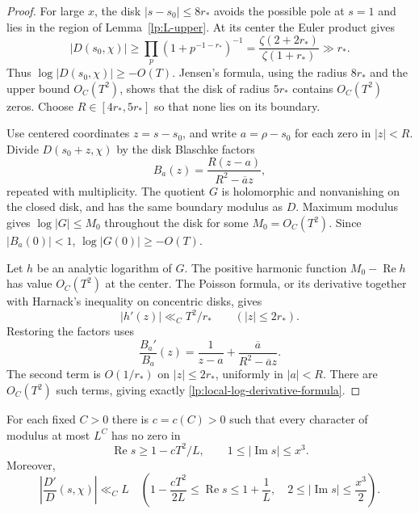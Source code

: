 \begin{proof}
For large $x$, the disk $|s-s_0|\le8r_*$ avoids the possible pole at
$s=1$ and lies in the region of Lemma~\ref{lp:L-upper}.
At its center the Euler product gives
\[
 |D(s_0,\chi)|\ge\prod_p(1+p^{-1-r_*})^{-1}
       =\frac{\zeta(2+2r_*)}{\zeta(1+r_*)}\gg r_*.
\]
Thus $\log|D(s_0,\chi)|\ge-O(T)$.  Jensen's formula, using the
radius $8r_*$ and the upper bound $O_C(T^2)$, shows that the disk
of radius $5r_*$ contains $O_C(T^2)$ zeros.  Choose $R\in[4r_*,5r_*]$
so that none lies on its boundary.

Use centered coordinates $z=s-s_0$, and write $a=\rho-s_0$ for
each zero in $|z|<R$.  Divide $D(s_0+z,\chi)$ by the disk Blaschke
factors
\[
 B_a(z)=\frac{R(z-a)}{R^2-\overline a z},
\]
repeated with multiplicity.  The quotient $G$ is holomorphic and
nonvanishing on the closed disk, and has the same boundary modulus
as $D$.  Maximum modulus gives $\log|G|\le M_0$ throughout the
disk for some $M_0=O_C(T^2)$.  Since $|B_a(0)|<1$,
$\log|G(0)|\ge-O(T)$.

Let $h$ be an analytic logarithm of $G$.  The positive harmonic
function $M_0-\operatorname{Re}h$ has value $O_C(T^2)$ at the
center.  The Poisson formula, or its derivative together with Harnack's
inequality on concentric disks, gives
\[
 |h'(z)|\ll_C T^2/r_*\qquad(|z|\le2r_*).
\]
Restoring the factors uses
\[
 \frac{B_a'}{B_a}(z)=\frac1{z-a}
       +\frac{\overline a}{R^2-\overline a z}.
\]
The second term is $O(1/r_*)$ on $|z|\le2r_*$, uniformly in
$|a|<R$.  There are $O_C(T^2)$ such terms, giving exactly
\eqref{lp:local-log-derivative-formula}.
\end{proof}

\begin{lemma}\label{lp:zero-free}
For each fixed $C>0$ there is $c=c(C)>0$ such that every character
of modulus at most $L^C$ has no zero in
\begin{equation}\label{lp:zero-free-region}
 \operatorname{Re}s\ge1-cT^2/L,\qquad
                    1\le|\operatorname{Im}s|\le x^3.
\end{equation}
Moreover,
\begin{equation}\label{lp:log-derivative-bound}
 \left|\frac{D'}D(s,\chi)\right|\ll_C L
 \quad\left(1-\frac{cT^2}{2L}\le\operatorname{Re}s\le1+\frac1L,
       \quad2\le|\operatorname{Im}s|\le\frac{x^3}{2}\right).
\end{equation}
\end{lemma}

